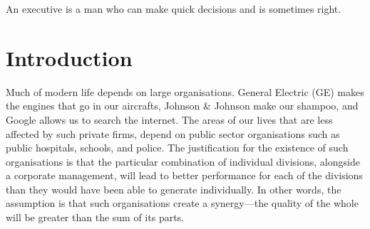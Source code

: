 \documentclass[a4paper, nobind, dvipsnames]{templates/ociamthesis}
\theoremstyle{definition}
\theoremstyle{definition}
\theoremstyle{definition}
\theoremstyle{definition}
\theoremstyle{remark}
\begin{document}
\begin{romanpages}
  \dominitoc %

\flushbottom

\tableofcontents

\listoffigures
	\mtcaddchapter

\listoftables
  \mtcaddchapter

\end{romanpages}

\flushbottom



\begin{savequote}
An executive is a man who can make quick decisions and is sometimes
right.
\end{savequote}

\hypertarget{introduction}{%
\chapter{Introduction}\label{introduction}}

\minitoc

Much of modern life depends on large organisations. General Electric (GE) makes
the engines that go in our aircrafts, Johnson \& Johnson make our shampoo, and
Google allows us to search the internet. The areas of our lives that are less
affected by such private firms, depend on public sector organisations such as
public hospitals, schools, and police. The justification for the existence of
such organisations is that the particular combination of individual divisions,
alongside a corporate management, will lead to better performance for each of
the divisions than they would have been able to generate individually. In other
words, the assumption is that such organisations create a synergy---the quality
of the whole will be greater than the sum of its parts.
\end{document}
